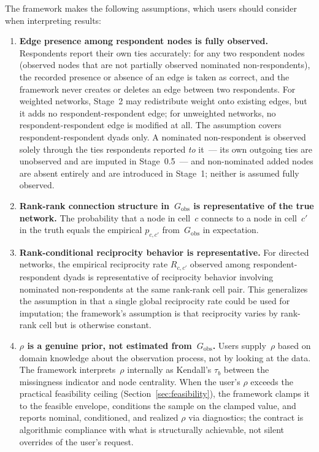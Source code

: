 \documentclass[11pt]{article}
\newcommand{\Gobs}{G_{\text{obs}}}
\newcommand{\Rmat}{R}
\begin{document}
The framework makes the following assumptions, which users should consider when interpreting results:

\begin{enumerate}[leftmargin=*, itemsep=4pt]
\item \textbf{Edge presence among respondent nodes is fully observed.} Respondents report their own ties accurately: for any two respondent nodes (observed nodes that are not partially observed nominated non-respondents), the recorded presence or absence of an edge is taken as correct, and the framework never creates or deletes an edge between two respondents. For weighted networks, Stage~2 may redistribute weight onto existing edges, but it adds no respondent-respondent edge; for unweighted networks, no respondent-respondent edge is modified at all. The assumption covers respondent-respondent dyads only. A nominated non-respondent is observed solely through the ties respondents reported \emph{to} it~--- its own outgoing ties are unobserved and are imputed in Stage~0.5~--- and non-nominated added nodes are absent entirely and are introduced in Stage~1; neither is assumed fully observed.

  \item \textbf{Rank-rank connection structure in~$\Gobs$ is representative of the true network.} The probability that a node in cell~$c$ connects to a node in cell~$c'$ in the truth equals the empirical $p_{c,c'}$ from~$\Gobs$ in expectation.

  \item \textbf{Rank-conditional reciprocity behavior is representative.} For directed networks, the empirical reciprocity rate $\Rmat_{c, c'}$ observed among respondent-respondent dyads is representative of reciprocity behavior involving nominated non-respondents at the same rank-rank cell pair. This generalizes the assumption in \citet{SmithMorganMoody2022} that a single global reciprocity rate could be used for imputation; the framework's assumption is that reciprocity varies by rank-rank cell but is otherwise constant.

  \item \textbf{$\rho$ is a genuine prior, not estimated from~$\Gobs$.} Users supply~$\rho$ based on domain knowledge about the observation process, not by looking at the data. The framework interprets~$\rho$ internally as Kendall's $\tau_b$ between the missingness indicator and node centrality. When the user's $\rho$ exceeds the practical feasibility ceiling (Section~\ref{sec:feasibility}), the framework clamps it to the feasible envelope, conditions the sample on the clamped value, and reports nominal, conditioned, and realized $\rho$ via diagnostics; the contract is algorithmic compliance with what is structurally achievable, not silent overrides of the user's request.


\end{enumerate}
\end{document}
